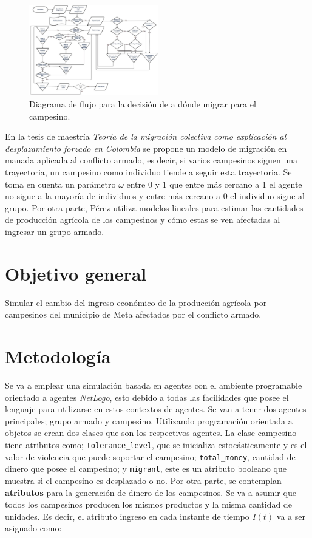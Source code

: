 \documentclass{article}
\begin{document}
\begin{figure}[ht]
  \centering
  \includegraphics[width=0.5\textwidth]{img/Fig1.png}
  \caption{\label{fig:fig1} Diagrama de flujo para la decisión de a dónde migrar para el campesino.}
\end{figure}


En la tesis de maestría \textit{Teoría de la migración colectiva como explicación al desplazamiento forzado en Colombia}\cite{Gutierrez2012} se propone un modelo de migración en manada aplicada al conflicto armado, es decir, si varios campesinos siguen una trayectoria, un campesino como individuo tiende a seguir esta trayectoria. Se toma en cuenta un parámetro $\omega$ entre 0 y 1 que entre más cercano a 1 el agente no sigue a la mayoría de individuos y entre más cercano a 0 el individuo sigue al grupo. Por otra parte, Pérez \cite{perez2016impacto} utiliza modelos lineales para estimar las cantidades de producción agrícola de los campesinos y cómo estas se ven afectadas al ingresar un grupo armado.





\section{Objetivo general}

Simular el cambio del ingreso económico de la producción agrícola por campesinos del municipio de Meta afectados por el conflicto armado. 


\section{Metodología}

Se va a emplear una simulación basada en agentes con el ambiente programable orientado a agentes \textit{NetLogo}\cite{wilensky1999netlogo}, esto debido a todas las facilidades que posee el lenguaje para utilizarse en estos contextos de agentes. Se van a tener dos agentes principales; grupo armado y campesino. Utilizando programación orientada a objetos se crean dos clases que son los respectivos agentes. La clase campesino tiene atributos como; \texttt{tolerance\_level}, que se inicializa estocásticamente y es el valor de violencia que puede soportar el campesino; \texttt{total\_money}, cantidad de dinero que posee el campesino; y \texttt{migrant}, este es un atributo booleano que muestra si el campesino es desplazado o no. Por otra parte, se contemplan \textbf{atributos} para la generación de dinero de los campesinos. Se va a asumir que todos los campesinos producen los mismos productos y la misma cantidad de unidades. Es decir, el atributo ingreso en cada instante de tiempo $I(t)$ va a ser asignado como:
\end{document}
